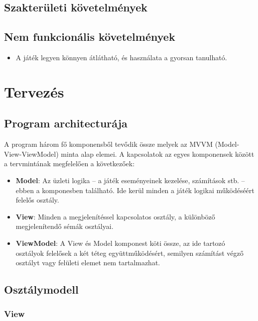 \documentclass[a4paper,12pt]{report}
\begin{document}
\section{Szakterületi követelmények}

\section{Nem funkcionális követelmények}
\begin{itemize}
\item A játék legyen könnyen átlátható, és használata a gyorsan tanulható.
\end{itemize} 

\chapter{Tervezés}

\section{Program architecturája}

A program három fő komponensből tevődik össze melyek az MVVM (Model-View-ViewModel) minta alap elemei. A kapcsolatok az egyes komponensek között a tervmintának megfelelően a következőek:
\begin{itemize}
\item {\bf Model}: Az üzleti logika – a játék eseményeinek kezelése, számítások stb. – ebben a komponesben található. Ide kerül minden a játék logikai működéséért felelős osztály.
\item {\bf View}: Minden a megjelenítéssel kapcsolatos osztály, a különböző megjelenítendő sémák osztályai.
\item {\bf ViewModel}: A View és Model komponest köti össze, az ide tartozó osztályok felelősek a két téteg együttműködésért, semilyen számítást végző osztályt vagy felületi elemet nem tartalmazhat.
\end{itemize}
 
\section{Osztálymodell}

\subsection{View}
\end{document}
